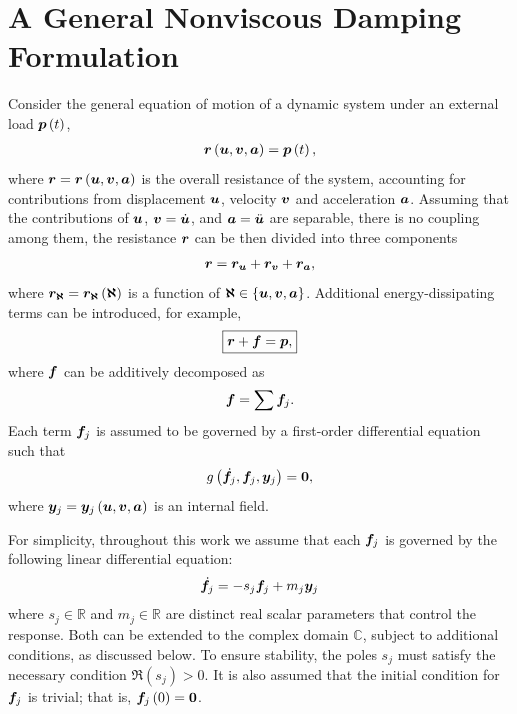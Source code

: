 \section{A General Nonviscous Damping Formulation}
Consider the general equation of motion of a dynamic system under an external load $\bm{p}\left(t\right)$,
\begin{gather}
    \bm{r}\left(\bm{u},\bm{v},\bm{a}\right)=\bm{p}\left(t\right),
\end{gather}
where $\bm{r}=\bm{r}\left(\bm{u},\bm{v},\bm{a}\right)$ is the overall resistance of the system, accounting for contributions from displacement $\bm{u}$, velocity $\bm{v}$ and acceleration $\bm{a}$.
Assuming that the contributions of $\bm{u}$, $\bm{v}=\dot{\bm{u}}$, and $\bm{a}=\ddot{\bm{u}}$ are separable, there is no coupling among them, the resistance $\bm{r}$ can be then divided into three components
\begin{gather}
    \bm{r}=\bm{r}_{\bm{u}}+\bm{r}_{\bm{v}}+\bm{r}_{\bm{a}},
\end{gather}
where $\bm{r}_{\bm{\aleph}}=\bm{r}_{\bm{\aleph}}\left(\bm{\aleph}\right)$ is a function of $\bm{\aleph}\in\left\{\bm{u},\bm{v},\bm{a}\right\}$.
Additional energy-dissipating terms can be introduced, for example,
\begin{gather}\label{eq:general_eom}
\boxed{\bm{r}+\bm{f}=\bm{p},}
\end{gather}
where $\bm{f}$ can be additively decomposed as
\begin{gather}
    \bm{f}=\sum\bm{f}_j.
\end{gather}
Each term $\bm{f}_j$ is assumed to be governed by a first-order differential equation such that
\begin{gather}\label{eq:general_de}
    g\left(\dot{\bm{f}}_j,\bm{f}_j,\bm{y}_j\right)=\bm{0},
\end{gather}
where $\bm{y}_j=\bm{y}_j\left(\bm{u},\bm{v},\bm{a}\right)$ is an internal field.

For simplicity, throughout this work we assume that each $\bm{f}_j$ is governed by the following linear differential equation:
\begin{gather}\label{eq:linear_de}
    \dot{\bm{f}}_j=-s_j\bm{f}_j+m_j\bm{y}_j
\end{gather}
where $s_j\in\mathbb{R}$ and $m_j\in\mathbb{R}$ are distinct real scalar parameters that control the response.
Both can be extended to the complex domain $\mathbb{C}$, subject to additional conditions, as discussed below.
To ensure stability, the poles $s_j$ must satisfy the necessary condition $\Re\left(s_j\right)>0$.
It is also assumed that the initial condition for $\bm{f}_j$ is trivial; that is, $\bm{f}_j\left(0\right)=\bm{0}$.
